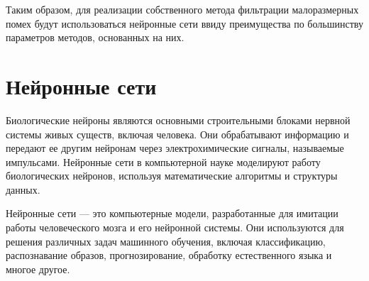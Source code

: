 \begin{table}[h!]
	\centering
    \captionsetup{justification=raggedleft,singlelinecheck=false}
	\caption{\label{tabular:methods_features} Сравнительная таблица рассмотренных методов по характеристикам}
\end{table}

Таким образом, для реализации собственного метода фильтрации малоразмерных помех будут использоваться нейронные сети ввиду преимущества по большинству параметров методов, основанных на них.

\section{Нейронные сети}

Биологические нейроны являются основными строительными блоками нервной системы живых существ, включая человека. Они обрабатывают информацию и передают ее другим нейронам через электрохимические сигналы, называемые импульсами. Нейронные сети в компьютерной науке моделируют работу биологических нейронов, используя математические алгоритмы и структуры данных.

Нейронные сети --- это компьютерные модели, разработанные для имитации работы человеческого мозга и его нейронной системы. Они используются для решения различных задач машинного обучения, включая классификацию, распознавание образов, прогнозирование, обработку естественного языка и многое другое.

